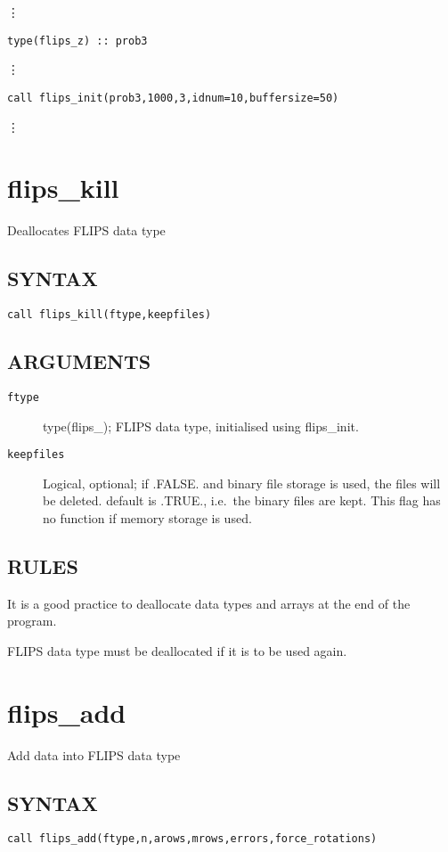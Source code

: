 \documentclass[a4paper,twoside]{refrep}
\newcommand{\code}[1]{{\tt #1}}
\newcommand{\aitem}[1]{\item[{\tt #1}]}
\newenvironment{arglist}
	{\begin{description}}
	{\end{description}}
\begin{document}
\vdots

\code{type(flips\_z) :: prob3}

\vdots

\code{call flips\_init(prob3,1000,3,idnum=10,buffersize=50)}

\vdots

\newpage
\section{flips\_kill}

Deallocates FLIPS data type

\subsection*{SYNTAX}
\code{call flips\_kill(ftype,keepfiles)}

\subsection*{ARGUMENTS}
\begin{arglist}
\aitem{ftype} type(flips\_<s|d|c|z>); FLIPS data type, initialised using flips\_init.
\aitem{keepfiles} Logical, optional; if .FALSE. and binary file storage is used, the files will be deleted. default is .TRUE., i.e.\ the binary files are kept. This flag has no function if memory storage is used.
\end{arglist}

\subsection*{RULES}
It is a good practice to deallocate data types and arrays at the end of the program.

FLIPS data type must be deallocated if it is to be used again. 

\newpage
\section{flips\_add}
Add data into FLIPS data type

\subsection*{SYNTAX}
\code{call flips\_add(ftype,n,arows,mrows,errors,force\_rotations)}
\end{document}
